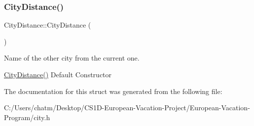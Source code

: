 \subsubsection{\texorpdfstring{CityDistance()}{CityDistance()}}
{\footnotesize\ttfamily City\+Distance\+::\+City\+Distance (\begin{DoxyParamCaption}{ }\end{DoxyParamCaption})\hspace{0.3cm}{\ttfamily [inline]}}



Name of the other city from the current one. 

\mbox{\hyperlink{struct_city_distance_aa486f287fb876e7aec9d41340a9a2b62}{City\+Distance()}} Default Constructor 

The documentation for this struct was generated from the following file\+:\begin{DoxyCompactItemize}
\item 
C\+:/\+Users/chatm/\+Desktop/\+C\+S1\+D-\/\+European-\/\+Vacation-\/\+Project/\+European-\/\+Vacation-\/\+Program/city.\+h\end{DoxyCompactItemize}
